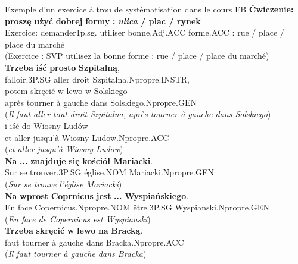 \documentclass[output=paper]{langscibook}
\begin{document}
\begin{otherlanguage}{french}
\ea\label{fig:watorek:3}
Exemple d’un exercice à trou de systématisation dans le cours FB
\gll \textbf{Ćwiczenie:} \textbf{proszę} \textbf{użyć} \textbf{dobrej} \textbf{formy} \textbf{:} \textbf{\textit{ulica} \textbf{/} \textbf{plac} \textbf{/} \textbf{rynek}}\\
      Exercice: demander1p.sg. utiliser   bonne.Adj.ACC           forme.ACC : rue / place / place du marché\\
\glt (Exercice : SVP utilisez la bonne forme : rue / place / place du marché)\medskip\\

\gll \textbf{Trzeba}             \textbf{iść}   \textbf{prosto} {\longrule} \textbf{Szpitalną},\\
      falloir.3P.SG   aller   droit {\longrule} Szpitalna.Npropre.INSTR,\\
\gll  potem   skręcić  w lewo    w {\longrule} Solskiego\\
      après    tourner  à gauche dans {\longrule} Solskiego.Npropre.GEN\\
\glt (\textit{Il faut aller tout droit {\longrule} Szpitalna, après tourner à gauche dans {\longrule} Solskiego})\medskip\\
\gll i   iść   do {\longrule} Wiosny Ludów\\
      et   aller   jusqu’à {\longrule} Wiosny Ludow.Npropre.ACC\\
\glt (\textit{et aller jusqu’à {\longrule} Wiosny Ludow})\medskip\\
\gll \textbf{Na} \textbf{...} \textbf{znajduje} \textbf{się}     \textbf{kościół}   \textbf{Mariacki}.\\
      Sur {\longrule} se trouver.3P.SG   église.NOM   Mariacki.Npropre.GEN\\
\glt (\textit{Sur {\longrule} se trouve l’église Mariacki})\medskip\\
\gll \textbf{Na} \textbf{wprost} {\longrule} \textbf{Coprnicus} \textbf{jest} \textbf{...} \textbf{Wyspiańskiego}.\\
      En face {\longrule} Copernicus.Npropre.NOM      être.3P.SG {\longrule} Wyspianski.Npropre.GEN\\
\glt (\textit{En face de {\longrule} Copernicus est {\longrule} Wyspianski})\medskip\\
\gll \textbf{Trzeba}   \textbf{skręcić}   \textbf{w} \textbf{lewo}   \textbf{na} {\longrule} \textbf{Bracką}.\\
      faut     tourner   à gauche   dans {\longrule} Bracka.Npropre.ACC\\
\glt (\textit{Il faut tourner à gauche dans {\longrule} Bracka})
\z



\end{otherlanguage}
\end{document}
